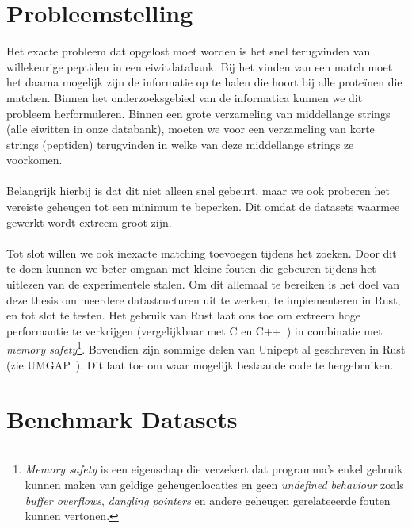 \section{Probleemstelling}\label{sec:probleemstelling}
Het exacte probleem dat opgelost moet worden is het snel terugvinden van willekeurige peptiden in een eiwitdatabank.
Bij het vinden van een match moet het daarna mogelijk zijn de informatie op te halen die hoort bij alle proteïnen die matchen.
Binnen het onderzoeksgebied van de informatica kunnen we dit probleem herformuleren.
Binnen een grote verzameling van middellange strings (alle eiwitten in onze databank), moeten we voor een verzameling van korte strings (peptiden) terugvinden in welke van deze middellange strings ze voorkomen.
\\ \\
Belangrijk hierbij is dat dit niet alleen snel gebeurt, maar we ook proberen het vereiste geheugen tot een minimum te beperken.
Dit omdat de datasets waarmee gewerkt wordt extreem groot zijn.
\\ \\
Tot slot willen we ook inexacte matching toevoegen tijdens het zoeken.
Door dit te doen kunnen we beter omgaan met kleine fouten die gebeuren tijdens het uitlezen van de experimentele stalen.
Om dit allemaal te bereiken is het doel van deze thesis om meerdere datastructuren uit te werken, te implementeren in Rust, en tot slot te testen.
Het gebruik van Rust laat ons toe om extreem hoge performantie te verkrijgen (vergelijkbaar met C en C++~\cite{rustPerformantie}) in combinatie met \textit{memory safety}\footnote{\textit{Memory safety} is een eigenschap die verzekert dat programma's enkel gebruik kunnen maken van geldige geheugenlocaties en geen \textit{undefined behaviour} zoals \textit{buffer overflows}, \textit{dangling pointers} en andere geheugen gerelateeerde fouten kunnen vertonen.}.
Bovendien zijn sommige delen van Unipept al geschreven in Rust (zie UMGAP~\cite{UMGAP_paper, UMGAP_source}).
Dit laat toe om waar mogelijk bestaande code te hergebruiken.


\section{Benchmark Datasets}\label{sec:datasets}

